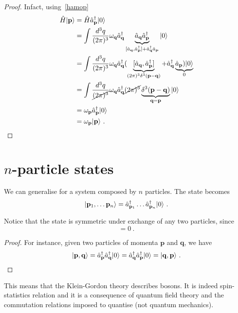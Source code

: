     \begin{proof}
        Infact, using~\eqref{hamop}
        \begin{equation*}
        \begin{aligned}
            \hat H \vert\mathbf p\rangle & = \hat H \hat a_{\mathbf p}^\dagger \vert0\rangle \\ & = \int \frac{d^3 q}{(2\pi)^3} \omega_{\mathbf q} \hat a_{\mathbf q}^\dagger \underbrace{\hat a_{\mathbf q} \hat a_{\mathbf p}^\dagger}_{[\hat a_{\mathbf q}, \hat a_{\mathbf p}^\dagger] + \hat a_{\mathbf q}^\dagger \hat a_{\mathbf p}} \vert0\rangle \\ & = \int \frac{d^3 q}{(2\pi)^3} \omega_{\mathbf q} \hat a_{\mathbf q}^\dagger (\underbrace{[\hat a_{\mathbf q}, \hat a_{\mathbf p}^\dagger]}_{(2\pi)^3 \delta^3 (\mathbf p - \mathbf q)} + \hat a_{\mathbf q}^\dagger \underbrace{\hat a_{\mathbf p}) \vert0\rangle}_0 \\ & = \int \frac{d^3 q}{\cancel{(2\pi)^3}} \omega_{\mathbf q} \hat a_{\mathbf q}^\dagger  \cancel{(2\pi)^3} \underbrace{\delta^3 (\mathbf p - \mathbf q)}_{\mathbf q = \mathbf p} \vert0\rangle \\ & = \omega_{\mathbf p} \hat a_{\mathbf p}^\dagger \vert0\rangle \\ & = \omega_{\mathbf p} \vert\mathbf p\rangle  ~.
        \end{aligned}
        \end{equation*}
    \end{proof}

\section{$n$-particle states}

    We can generalise for a system composed by $n$ particles. The state becomes 
    \begin{equation*}
        \vert\mathbf p_1, \ldots \mathbf p_n\rangle = \hat a_{\mathbf p_1}^\dagger \ldots \hat a_{\mathbf p_n}^\dagger \vert0\rangle ~.
    \end{equation*}
    
    Notice that the state is symmetric under exchange of any two particles, since 
    \begin{equation*}
        [\hat a_{\mathbf p_i}^\dagger, \hat a_{\mathbf p_j}^\dagger ] = 0 ~.
    \end{equation*}
    \begin{proof}
        For instance, given two particles of momenta $\mathbf p$ and $\mathbf q$, we have 
        \begin{equation*}
            \vert\mathbf p, \mathbf q\rangle = \hat a_{\mathbf p}^\dagger \hat a_{\mathbf q}^\dagger \vert0\rangle = \hat a_{\mathbf q}^\dagger  \hat a_{\mathbf p}^\dagger \vert0\rangle = \vert\mathbf q, \mathbf p\rangle ~.
        \end{equation*}
    \end{proof}
    This means that the Klein-Gordon theory describes bosons. It is indeed spin-statistics relation and it is a consequence of quantum field theory and the commutation relations imposed to quantise (not quantum mechanics).

